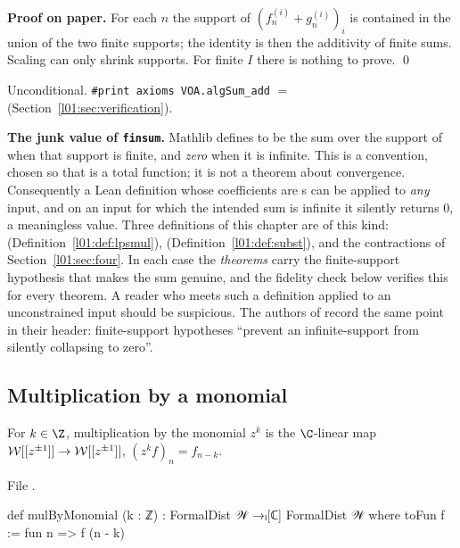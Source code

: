 \textbf{Proof on paper.} For each $n$ the support of $(f^{(i)}_n+g^{(i)}_n)_i$ is contained in the
union of the two finite supports; the identity is then the additivity of finite sums. Scaling can
only shrink supports. For finite $I$ there is nothing to prove. \qed

\begin{status}
Unconditional. \texttt{\#print axioms VOA.algSum\_add} $=$ 
(Section~\ref{l01:sec:verification}).
\end{status}

\begin{warning}\label{l01:warn:finsum}
\textbf{The junk value of \texttt{finsum}.} Mathlib defines  to be the sum over the support
of  when that support is finite, and \emph{zero} when it is infinite. This is a convention, chosen
so that  is a total function; it is not a theorem about convergence. Consequently a Lean
definition whose coefficients are s can be applied to \emph{any} input, and on an input for
which the intended sum is infinite it silently returns $0$, a meaningless value. Three definitions of
this chapter are of this kind:  (Definition~\ref{l01:def:lpsmul}), 
(Definition~\ref{l01:def:subst}), and the contractions of Section~\ref{l01:sec:four}. In each case the
\emph{theorems} carry the finite-support hypothesis that makes the sum genuine, and the fidelity check
below verifies this for every theorem. A reader who meets such a definition applied to an
unconstrained input should be suspicious. The authors of  record the same
point in their header: finite-support hypotheses ``prevent an infinite-support  from silently
collapsing to zero''.
\end{warning}

\subsection{Multiplication by a monomial}

\begin{definition}[Multiplication by $z^k$]\label{l01:def:monomial}
For $k\in\Z$, multiplication by the monomial $z^k$ is the $\C$-linear map
$\mathcal{W}[[z^{\pm1}]]\to\mathcal{W}[[z^{\pm1}]]$, $(z^kf)_n = f_{n-k}$.
\end{definition}

\noindent File .
\begin{leancode}
def mulByMonomial (k : ℤ) : FormalDist 𝒲 →ₗ[ℂ] FormalDist 𝒲 where
  toFun f := fun n => f (n - k)
\end{leancode}

